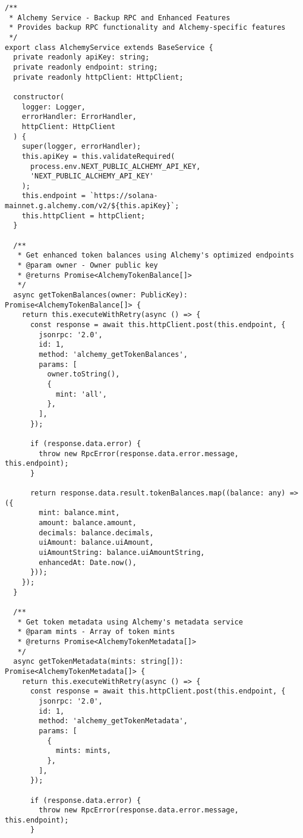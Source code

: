 \documentclass[11pt,a4paper]{article}
\begin{document}
\begin{lstlisting}[style=typescript, caption=Alchemy Service Implementation]
/**
 * Alchemy Service - Backup RPC and Enhanced Features
 * Provides backup RPC functionality and Alchemy-specific features
 */
export class AlchemyService extends BaseService {
  private readonly apiKey: string;
  private readonly endpoint: string;
  private readonly httpClient: HttpClient;

  constructor(
    logger: Logger,
    errorHandler: ErrorHandler,
    httpClient: HttpClient
  ) {
    super(logger, errorHandler);
    this.apiKey = this.validateRequired(
      process.env.NEXT_PUBLIC_ALCHEMY_API_KEY,
      'NEXT_PUBLIC_ALCHEMY_API_KEY'
    );
    this.endpoint = `https://solana-mainnet.g.alchemy.com/v2/${this.apiKey}`;
    this.httpClient = httpClient;
  }

  /**
   * Get enhanced token balances using Alchemy's optimized endpoints
   * @param owner - Owner public key
   * @returns Promise<AlchemyTokenBalance[]>
   */
  async getTokenBalances(owner: PublicKey): Promise<AlchemyTokenBalance[]> {
    return this.executeWithRetry(async () => {
      const response = await this.httpClient.post(this.endpoint, {
        jsonrpc: '2.0',
        id: 1,
        method: 'alchemy_getTokenBalances',
        params: [
          owner.toString(),
          {
            mint: 'all',
          },
        ],
      });

      if (response.data.error) {
        throw new RpcError(response.data.error.message, this.endpoint);
      }

      return response.data.result.tokenBalances.map((balance: any) => ({
        mint: balance.mint,
        amount: balance.amount,
        decimals: balance.decimals,
        uiAmount: balance.uiAmount,
        uiAmountString: balance.uiAmountString,
        enhancedAt: Date.now(),
      }));
    });
  }

  /**
   * Get token metadata using Alchemy's metadata service
   * @param mints - Array of token mints
   * @returns Promise<AlchemyTokenMetadata[]>
   */
  async getTokenMetadata(mints: string[]): Promise<AlchemyTokenMetadata[]> {
    return this.executeWithRetry(async () => {
      const response = await this.httpClient.post(this.endpoint, {
        jsonrpc: '2.0',
        id: 1,
        method: 'alchemy_getTokenMetadata',
        params: [
          {
            mints: mints,
          },
        ],
      });

      if (response.data.error) {
        throw new RpcError(response.data.error.message, this.endpoint);
      }


\end{lstlisting}
\end{document}
